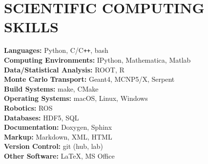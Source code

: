 \section{\small{SCIENTIFIC COMPUTING \\ SKILLS}}

\textbf{Languages:} \hfill Python, C/C\verb!++!, bash\\
\textbf{Computing Environments:} \hfill IPython, Mathematica, Matlab \\
\textbf{Data/Statistical Analysis:} \hfill ROOT, R\\
\textbf{Monte Carlo Transport:} \hfill Geant4, MCNP5/X, Serpent\\
\textbf{Build Systems:} \hfill make, CMake\\
\textbf{Operating Systems:} \hfill macOS, Linux, Windows\\
\textbf{Robotics:} \hfill ROS\\
\textbf{Databases:} \hfill HDF5, SQL\\
\textbf{Documentation:} \hfill Doxygen, Sphinx\\
\textbf{Markup:} \hfill Markdown, XML, HTML\\
\textbf{Version Control:} \hfill git (hub, lab)\\
\textbf{Other Software:} \hfill \LaTeX, MS Office

%
